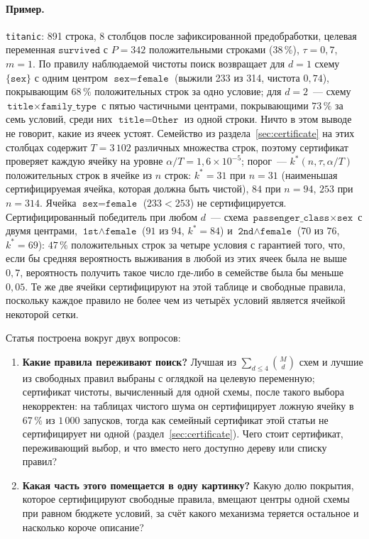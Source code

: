\documentclass[11pt]{article}
\begin{document}
\paragraph{Пример.}\label{sec:intro-example} \texttt{titanic}: 891 строка, 8 столбцов после зафиксированной предобработки, целевая переменная $\texttt{survived}$ с $P=342$ положительными строками (38\,\%), $\tau=0{,}7$, $m=1$. По правилу наблюдаемой чистоты поиск возвращает для $d=1$ схему $\{\texttt{sex}\}$ с одним центром $\texttt{sex}=\texttt{female}$ (выжили 233 из 314, чистота $0{,}74$), покрывающим $68\,\%$ положительных строк за одно условие; для $d=2$~--- схему $\texttt{title}\times\texttt{family\_type}$ с пятью частичными центрами, покрывающими $73\,\%$ за семь условий, среди них $\texttt{title}=\texttt{Other}$ из одной строки. Ничто в этом выводе не говорит, какие из ячеек устоят. Семейство из раздела~\ref{sec:certificate} на этих столбцах содержит $T=3\,102$ различных множества строк, поэтому сертификат проверяет каждую ячейку на уровне $\alpha/T=1{,}6\times10^{-5}$; порог~--- $k^*(n,\tau,\alpha/T)$ положительных строк в ячейке из $n$ строк: $k^*=31$ при $n=31$ (наименьшая сертифицируемая ячейка, которая должна быть чистой), $84$ при $n=94$, $253$ при $n=314$. Ячейка $\texttt{sex}=\texttt{female}$ ($233<253$) не сертифицируется. Сертифицированный победитель при любом $d$~--- схема $\texttt{passenger\_class}\times\texttt{sex}$ с двумя центрами, $\texttt{1st}\wedge\texttt{female}$ ($91$ из $94$, $k^*=84$) и $\texttt{2nd}\wedge\texttt{female}$ ($70$ из $76$, $k^*=69$): $47\,\%$ положительных строк за четыре условия с гарантией того, что, если бы средняя вероятность выживания в любой из этих ячеек была не выше $0{,}7$, вероятность получить такое число где-либо в семействе была бы меньше $0{,}05$. Те же две ячейки сертифицируют на этой таблице и свободные правила, поскольку каждое правило не более чем из четырёх условий является ячейкой некоторой сетки.

Статья построена вокруг двух вопросов:

\begin{enumerate}
\item \textbf{Какие правила переживают поиск?} Лучшая из $\sum_{d\le 4}\binom{M}{d}$ схем и лучшие из свободных правил выбраны с оглядкой на целевую переменную; сертификат чистоты, вычисленный для одной схемы, после такого выбора некорректен: на таблицах чистого шума он сертифицирует ложную ячейку в 67\,\% из $1\,000$ запусков, тогда как семейный сертификат этой статьи не сертифицирует ни одной (раздел~\ref{sec:certificate}). Чего стоит сертификат, переживающий выбор, и что вместо него доступно дереву или списку правил?
\item \textbf{Какая часть этого помещается в одну картинку?} Какую долю покрытия, которое сертифицируют свободные правила, вмещают центры одной схемы при равном бюджете условий, за счёт какого механизма теряется остальное и насколько короче описание?
\end{enumerate}
\end{document}
